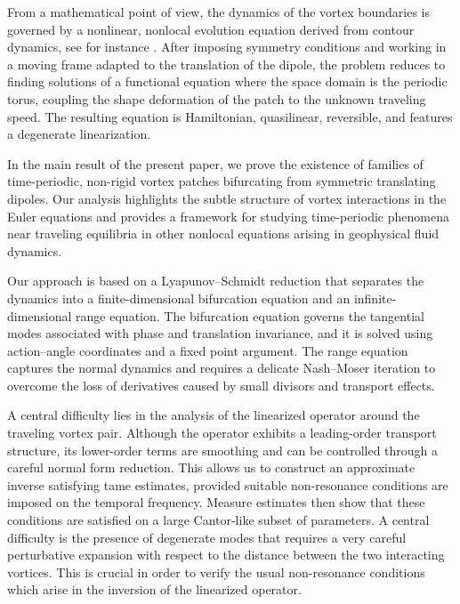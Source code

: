 \documentclass[a4paper,reqno,10pt]{article}
\begin{document}
From a mathematical point of view, the dynamics of the vortex boundaries is governed by a nonlinear, nonlocal evolution equation derived from contour dynamics, see for instance \cite{BertozziMajda,chemin}. 
After imposing symmetry conditions and working in a moving frame adapted to the translation of the dipole, the problem reduces to finding  solutions of a functional equation where the space domain is the periodic torus, coupling the shape deformation of the patch to the unknown traveling speed.
The resulting equation is Hamiltonian, quasilinear, reversible, and features a degenerate linearization.

In the main result of the present paper, we prove the existence of families of time-periodic, non-rigid vortex patches bifurcating from symmetric translating dipoles. 
 Our analysis highlights the subtle structure of vortex interactions in the Euler equations and provides a framework for studying time-periodic phenomena near traveling equilibria in other nonlocal equations arising in geophysical fluid dynamics.

Our approach is based on a Lyapunov–Schmidt reduction that separates the dynamics into a finite-dimensional bifurcation equation and an infinite-dimensional range equation. The bifurcation equation governs the tangential modes associated with phase and translation invariance, and it is solved using action–angle coordinates and a fixed point argument. The range equation captures the normal dynamics and requires a delicate Nash–Moser iteration to overcome the loss of derivatives caused by small divisors and transport effects.

A central difficulty lies in the analysis of the linearized operator around the traveling vortex pair. Although the operator exhibits a leading-order transport structure, its lower-order terms are smoothing and can be controlled through a careful normal form reduction. This allows us to construct an approximate inverse satisfying tame estimates, provided suitable non-resonance conditions are imposed on the temporal frequency. Measure estimates then show that these conditions are satisfied on a large Cantor-like subset of parameters. A central difficulty is the presence of degenerate modes that requires a very careful perturbative expansion with respect to the distance between the two interacting vortices. This is crucial in order to verify the usual non-resonance conditions which arise in the inversion of the linearized operator. %
\end{document}
